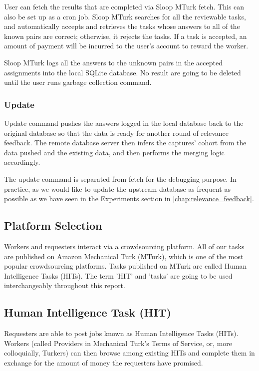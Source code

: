 User can fetch the results that are completed via Sloop MTurk fetch. This can
also be set up as a cron job. Sloop MTurk searches for all the reviewable
tasks, and automatically accepts and retrieves the tasks whose answers to all
of the known pairs are correct; otherwise, it rejects the tasks. If a task is
accepted, an amount of payment will be incurred to the user's account to reward
the worker.

Sloop MTurk logs all the answers to the unknown pairs in the accepted
assignments into the local SQLite database. No result are going to be deleted
until the user runs garbage collection command.

\subsubsection{Update}

Update command pushes the answers logged in the local database back to the
original database so that the data is ready for another round of relevance
feedback. The remote database server then infers the captures' cohort from the
data pushed and the existing data, and then performs the merging logic
accordingly\cite{sloopdocs}. 

The update command is separated from fetch for the debugging purpose. In
practice, as we would like to update the upstream database as frequent as
possible as we have seen in the Experiments section in
\ref{chap:relevance_feedback}.

\subsection{Platform Selection}

Workers and requesters interact via a crowdsourcing platform. All of our tasks
are published on Amazon Mechanical Turk (MTurk), which is one of the most
popular crowdsourcing platforms. Tasks published on MTurk are called Human
Intelligence Tasks (HITs). The term 'HIT' and 'tasks' are going to be used
interchangeably throughout this report.

\subsection{Human Intelligence Task (HIT)}

Requesters are able to post jobs known as Human Intelligence Tasks (HITs).
Workers (called Providers in Mechanical Turk's Terms of Service, or, more
colloquially, Turkers) can then browse among existing HITs and complete them in
exchange for the amount of money the requesters have promised.

